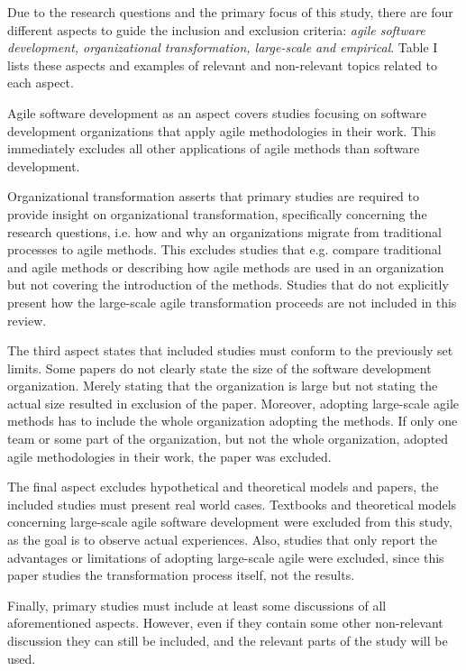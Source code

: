 
Due to the research questions and the primary focus of this study, there are
four different aspects to guide the inclusion and exclusion criteria:
\textit{agile software development, organizational transformation, large-scale
and empirical}. Table I lists these aspects and examples of relevant and
non-relevant topics related to each aspect.


\vspace{1.5cm}

Agile software development as an aspect covers studies focusing on
software development organizations that apply agile methodologies in
their work. This immediately excludes all other applications of agile
methods than software development.

Organizational transformation asserts that primary studies are required
to provide insight on organizational transformation, specifically
concerning the research questions, i.e. how and why an organizations
migrate from traditional processes to agile methods. This excludes
studies that e.g. compare traditional and agile methods or describing
how agile methods are used in an organization but not covering the
introduction of the methods. Studies that do not explicitly present how
the large-scale agile transformation proceeds are not included in this
review.

The third aspect states that included studies must conform to the
previously set limits. Some papers do not clearly state the size of the
software development organization. Merely stating that the organization
is large but not stating the actual size resulted in exclusion of the
paper. Moreover, adopting large-scale agile methods has to include the
whole organization adopting the methods. If only one team or some part
of the organization, but not the whole organization, adopted agile
methodologies in their work, the paper was excluded.

The final aspect excludes hypothetical and theoretical models
and papers, the included studies must present real world cases.
Textbooks and theoretical models concerning large-scale agile software
development were excluded from this study, as the goal is to observe
actual experiences. Also, studies that only report the advantages or
limitations of adopting large-scale agile were excluded, since this
paper studies the transformation process itself, not the results.

Finally, primary studies must include at least some discussions of
all aforementioned aspects. However, even if they contain some other
non-relevant discussion they can still be included, and the relevant
parts of the study will be used.
